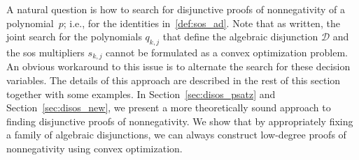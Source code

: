 \documentclass[12pt]{article}
\newcommand{\mcD}{\mathcal{D}}
\theoremstyle{remark}
\begin{document}


A natural question is how to search for disjunctive proofs of nonnegativity of a polynomial~$p$; i.e., for the identities in~\eqref{def:sos_ad}. Note that as written, the joint search for the polynomials $q_{k,j}$ that define the algebraic disjunction $\mathcal{D}$ and the sos multipliers $s_{k,j}$ cannot be formulated as a convex optimization problem. An obvious workaround to this issue is to alternate the search for these decision variables. The details of this approach are described in the rest of this section together with some examples. In Section~\ref{sec:disos_psatz} and Section~\ref{sec:disos_new}, we present a more theoretically sound approach to finding disjunctive proofs of nonnegativity. We show that by appropriately fixing a family of algebraic disjunctions, we can always construct low-degree proofs of nonnegativity using convex optimization.







\end{document}
